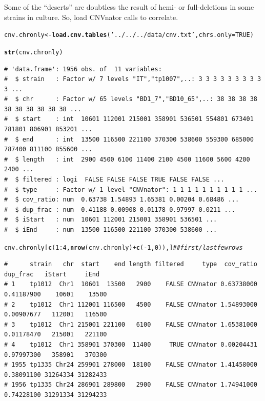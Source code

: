 \documentclass{article}\usepackage[]{graphicx}\usepackage[]{color}
\makeatletter
\newcommand{\hlnum}[1]{\textcolor[rgb]{0.686,0.059,0.569}{#1}}%
\newcommand{\hlstr}[1]{\textcolor[rgb]{0.192,0.494,0.8}{#1}}%
\newcommand{\hlcom}[1]{\textcolor[rgb]{0.678,0.584,0.686}{\textit{#1}}}%
\newcommand{\hlopt}[1]{\textcolor[rgb]{0,0,0}{#1}}%
\newcommand{\hlstd}[1]{\textcolor[rgb]{0.345,0.345,0.345}{#1}}%
\newcommand{\hlkwb}[1]{\textcolor[rgb]{0.69,0.353,0.396}{#1}}%
\newcommand{\hlkwc}[1]{\textcolor[rgb]{0.333,0.667,0.333}{#1}}%
\newcommand{\hlkwd}[1]{\textcolor[rgb]{0.737,0.353,0.396}{\textbf{#1}}}%
\newenvironment{kframe}{%
 \def\at@end@of@kframe{}%
 \ifinner\ifhmode%
  \def\at@end@of@kframe{\end{minipage}}%
  \begin{minipage}{\columnwidth}%
 \fi\fi%
 \def\FrameCommand##1{\hskip\@totalleftmargin \hskip-\fboxsep
 \colorbox{shadecolor}{##1}\hskip-\fboxsep
     \hskip-\linewidth \hskip-\@totalleftmargin \hskip\columnwidth}%
 \MakeFramed {\advance\hsize-\width
   \@totalleftmargin\z@ \linewidth\hsize
   \@setminipage}}%
 {\par\unskip\endMakeFramed%
 \at@end@of@kframe}
\newenvironment{knitrout}{}{} %
\makeatother
\begin{document}
Some of the ``deserts'' are doubtless the result of hemi- or full-deletions in some strains in 
culture.  So, load CNVnator calls to correlate.

\begin{knitrout}\footnotesize
{}\color{fgcolor}\begin{kframe}
\begin{alltt}
\hlstd{cnv.chronly} \hlkwb{<-} \hlkwd{load.cnv.tables}\hlstd{(}\hlstr{'../../../data/cnv.txt'}\hlstd{,} \hlkwc{chrs.only}\hlstd{=}\hlnum{TRUE}\hlstd{)}

\hlkwd{str}\hlstd{(cnv.chronly)}
\end{alltt}
\begin{verbatim}
# 'data.frame':	1956 obs. of  11 variables:
#  $ strain   : Factor w/ 7 levels "IT","tp1007",..: 3 3 3 3 3 3 3 3 3 3 ...
#  $ chr      : Factor w/ 65 levels "BD1_7","BD10_65",..: 38 38 38 38 38 38 38 38 38 38 ...
#  $ start    : int  10601 112001 215001 358901 536501 554801 673401 781801 806901 853201 ...
#  $ end      : int  13500 116500 221100 370300 538600 559300 685000 787400 811100 855600 ...
#  $ length   : int  2900 4500 6100 11400 2100 4500 11600 5600 4200 2400 ...
#  $ filtered : logi  FALSE FALSE FALSE TRUE FALSE FALSE ...
#  $ type     : Factor w/ 1 level "CNVnator": 1 1 1 1 1 1 1 1 1 1 ...
#  $ cov_ratio: num  0.63738 1.54893 1.65381 0.00204 0.68486 ...
#  $ dup_frac : num  0.41188 0.00908 0.01178 0.97997 0.0211 ...
#  $ iStart   : num  10601 112001 215001 358901 536501 ...
#  $ iEnd     : num  13500 116500 221100 370300 538600 ...
\end{verbatim}
\begin{alltt}
\hlstd{cnv.chronly[}\hlkwd{c}\hlstd{(}\hlnum{1}\hlopt{:}\hlnum{4}\hlstd{,}\hlkwd{nrow}\hlstd{(cnv.chronly)}\hlopt{+}\hlkwd{c}\hlstd{(}\hlopt{-}\hlnum{1}\hlstd{,}\hlnum{0}\hlstd{)),]}                     \hlcom{## first/last few rows}
\end{alltt}
\begin{verbatim}
#      strain   chr  start    end length filtered     type  cov_ratio   dup_frac   iStart     iEnd
# 1    tp1012  Chr1  10601  13500   2900    FALSE CNVnator 0.63738000 0.41187900    10601    13500
# 2    tp1012  Chr1 112001 116500   4500    FALSE CNVnator 1.54893000 0.00907677   112001   116500
# 3    tp1012  Chr1 215001 221100   6100    FALSE CNVnator 1.65381000 0.01178470   215001   221100
# 4    tp1012  Chr1 358901 370300  11400     TRUE CNVnator 0.00204431 0.97997300   358901   370300
# 1955 tp1335 Chr24 259901 278000  18100    FALSE CNVnator 1.41458000 0.38091100 31264334 31282433
# 1956 tp1335 Chr24 286901 289800   2900    FALSE CNVnator 1.74941000 0.74228100 31291334 31294233
\end{verbatim}
\end{kframe}
\end{knitrout}
\end{document}

